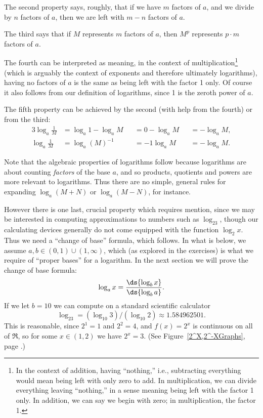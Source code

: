 The second property says, roughly, that if we have $m$ factors
of $a$, and we divide by $n$ factors of $a$, then
we are left with $m-n$ factors of $a$.  

The third says that if $M$ represents $m$ factors of $a$,
then $M^p$ represents $p\cdot m$ factors of $a$.

The fourth can be interpreted as meaning, in the context of
multiplication\footnote{%
In the context of addition, having ``nothing,'' i.e., subtracting
everything would mean being left with
only zero to add.  In multiplication, we can divide everything
leaving ``nothing,'' in a sense meaning being left with the
factor 1 only.  In addition, we can say we begin with zero;
in multiplication, the factor 1.
} (which is arguably the context of exponents and therefore
ultimately logarithms), having no factors of $a$ is the same
as being left with the factor 1 only.  Of course it also
follows from our definition of logarithms, since 1 is the
zeroth power of $a$.

The fifth property can be achieved by the second (with help from
the fourth) or from the third:
\begin{alignat*}{3}
\log_a\frac1M&=\log_a1-\log_aM&&=0-\log_aM&&=-\log_aM,\\
\log_a\frac1M&=\log_a(M)^{-1}&&=-1\log_aM&&=-\log_aM.
\end{alignat*}



Note that the algebraic properties of logarithms follow because
logarithms are about
counting {\it factors} of the base $a$, and so products, quotients
and powers are more relevant to logarithms.  Thus there are
no simple, general rules for expanding $\log_a(M+N)$ or $\log_a(M-N)$,
for instance.  

However there is one last, crucial property which requires mention,
since we may be interested in computing approximations to 
numbers such as $\log_23$, though our calculating devices
generally do not come equipped with the function $\log_2x$.
Thus we need a ``change of base'' formula, which follows.
In what is below, we assume $a,b\in(0,1)\cup(1,\infty)$,
which (as explored in the exercises)
is what we require of ``proper bases'' for a logarithm.
In the next section we will prove the change of base formula:
\begin{equation}
\log_ax=\frac{\ds{\log_bx}}{\ds{\log_ba}}.\label{ChangeOfBase}
\end{equation}
If we let $b=10$ we can compute on a standard scientific calculator
$$\log_23=(\log_{10}3)/(\log_{10}2)\approx1.584962501.$$
This is reasonable, since $2^1=1$ and $2^2=4$, and $f(x)=2^x$
is continuous on all of $\Re$,
so for some $x\in(1,2)$ we have $2^x=3$.  (See
Figure~\ref{2^X,2^-XGraphs}, page \pageref{2^X,2^-XGraphs}.)

